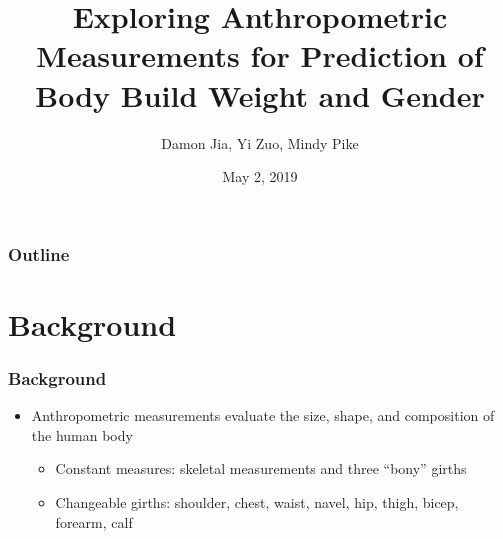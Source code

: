 \documentclass{beamer}
\title{Exploring Anthropometric Measurements for Prediction of Body Build Weight and Gender}
\author{Damon Jia, Yi Zuo, Mindy Pike}
\institute{Vanderbilt University}
\date{May 2, 2019}
\begin{document}
\begin{frame}
\titlepage
\end{frame}

\begin{frame}
\frametitle{Outline}
\tableofcontents
\end{frame}

\section{Background}


\begin{frame}
\frametitle{Background}

\begin{itemize}
	\item Anthropometric measurements evaluate the size, shape, and composition of the human body
		\begin{itemize}
			\item Constant measures: skeletal measurements and three “bony” girths
		\end{itemize}
		\begin{itemize}
			\item Changeable girths: shoulder, chest, waist, navel, hip, thigh, bicep, forearm, calf
		\end{itemize}
\end{itemize}
\end{frame}
\end{document}
